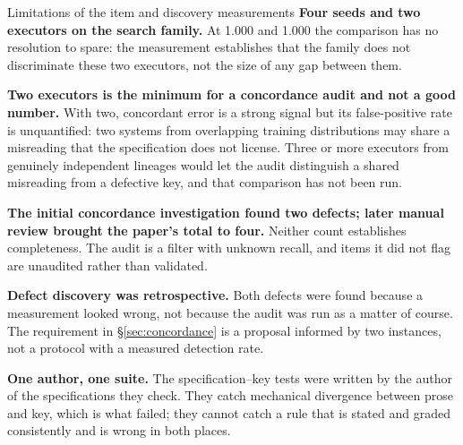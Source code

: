 \begin{cautionbox}{Limitations of the item and discovery measurements}
\textbf{Four seeds and two executors on the search family.} At 1.000 and 1.000 the comparison has no resolution to spare: the measurement establishes that the family does not discriminate these two executors, not the size of any gap between them.

\textbf{Two executors is the minimum for a concordance audit and not a good number.} With two, concordant error is a strong signal but its false-positive rate is unquantified: two systems from overlapping training distributions may share a misreading that the specification does not license. Three or more executors from genuinely independent lineages would let the audit distinguish a shared misreading from a defective key, and that comparison has not been run.

\textbf{The initial concordance investigation found two defects; later manual review brought the paper's total to four.} Neither count establishes completeness. The audit is a filter with unknown recall, and items it did not flag are unaudited rather than validated.

\textbf{Defect discovery was retrospective.} Both defects were found because a measurement looked wrong, not because the audit was run as a matter of course. The requirement in \S\ref{sec:concordance} is a proposal informed by two instances, not a protocol with a measured detection rate.

\textbf{One author, one suite.} The specification--key tests were written by the author of the specifications they check. They catch mechanical divergence between prose and key, which is what failed; they cannot catch a rule that is stated and graded consistently and is wrong in both places.
\end{cautionbox}

